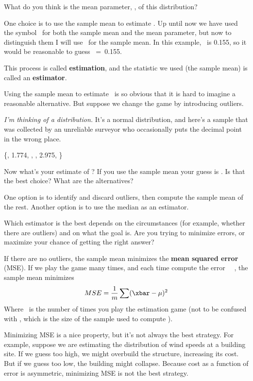 \documentclass[12pt]{book}
\begin{document}
What do you think is the mean parameter, \mymu, of this distribution?

One choice is to use the sample mean to estimate \mymu.  Up
until now we have used the symbol \mymu~for both the sample mean and
the mean parameter, but now to distinguish them I will use \myxbar~for 
the sample mean.  In this example, \myxbar~is 0.155, so it would
be reasonable to guess \mymu~=~0.155.

This process is called {\bf estimation}, and the statistic we used
(the sample mean) is called an {\bf estimator}.

Using the sample mean to estimate \mymu~is so obvious that it is hard
to imagine a reasonable alternative.  But suppose we change the game by
introducing outliers.  

{\em I'm thinking of a distribution.}  It's a normal distribution, and
here's a sample that was collected by an unreliable surveyor who
occasionally puts the decimal point in the wrong place.

\{, 1.774, , , 2.975, \}

Now what's your estimate of \mymu?  If you use the sample mean your
guess is .  Is that the best choice?  What are the alternatives?

One option is to identify and discard outliers, then compute the sample
mean of the rest.  Another option is to use the median as an estimator.

Which estimator is the best depends on the circumstances (for example,
whether there are outliers) and on what the goal is.  Are you
trying to minimize errors, or maximize your chance of getting the
right answer?

If there are no outliers, the sample mean minimizes the {\bf mean squared
error} (MSE).  If we play the game many times, and each time
compute the error \myxbar~\minus~\mymu, the sample mean minimizes
%
\[ MSE = \frac{1}{m} \sum (\xbar - \mu)^2 \]
%
Where \m~is the number of times you play the estimation game (not to
be confused with \n, which is the size of the sample used to compute
\myxbar). 

Minimizing MSE is a nice property, but it's not always the best
strategy.  For example, suppose we are estimating the distribution of
wind speeds at a building site.  If we guess too high, we might
overbuild the structure, increasing its cost.  But if we guess too
low, the building might collapse.  Because cost as a function of
error is asymmetric, minimizing MSE is not the best strategy.
\end{document}
